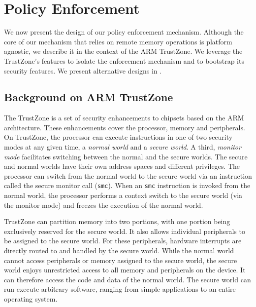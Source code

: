 \section{Policy Enforcement}
\label{section:mechanism}

We now present the design of our policy enforcement mechanism. Although the
core of our mechanism that relies on remote memory operations is platform
agnostic, we describe it in the context of the ARM TrustZone. We leverage the
TrustZone's features to isolate the enforcement mechanism and to bootstrap its
security features. We present alternative designs in
.

\subsection{Background on ARM TrustZone}
\label{section:mechanism:armback}

The TrustZone is a set of security enhancements to chipsets based on the ARM
architecture. These enhancements cover the processor, memory and peripherals.
On TrustZone, the processor can execute instructions in one of two security
modes at any given time, a \textit{normal world} and a \textit{secure world}. A
third, \textit{monitor mode} facilitates switching between the normal and the
secure worlds.  The secure and normal worlds have their own address spaces and
different privileges.  The processor can switch from the normal world to the
secure world via an instruction called the secure monitor call (\texttt{smc}).
When an \texttt{smc} instruction is invoked from the normal world, the
processor performs a context switch to the secure world (via the monitor mode)
and freezes the execution of the normal world.

TrustZone can partition memory into two portions, with one portion being
exclusively reserved for the secure world. It also allows individual
peripherals to be assigned to the secure world.  For these peripherals,
hardware interrupts are directly routed to and handled by the secure world.
While the normal world cannot access peripherals or memory assigned to the
secure world, the secure world enjoys unrestricted access to all memory and
peripherals on the device. It can therefore access the code and data 
of the normal world. The secure world can run execute arbitrary software,
ranging from simple applications to an entire operating system.
%

